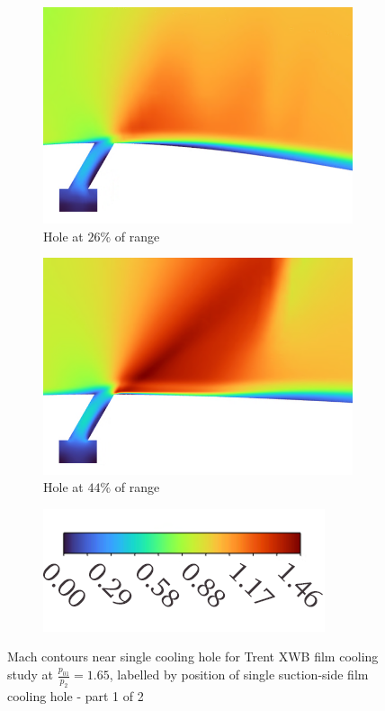 \documentclass[a4paper, 11pt, oneside]{report}
\begin{document}
\begin{figure}[H]
\begin{subfigure}{.42\textwidth}
		\includegraphics[width=\linewidth]{figs/sch_detail_mach_contours_2.png}
		\caption{Hole at $26\%$ of range}
	\end{subfigure}
	\hspace{0.05\textwidth}
	\begin{subfigure}{.42\textwidth}
		\centering
		\includegraphics[width=\linewidth]{figs/sch_detail_mach_contours_3.png}
		\caption{Hole at $44\%$ of range}
	\end{subfigure}
	\begin{subfigure}{.4\textwidth}
		\centering
		\includegraphics[width=\linewidth]{figs/mach_legend_sch_horizontal.png}
	\end{subfigure}
	\caption{Mach contours near single cooling hole for Trent XWB film cooling study at $\frac{p_{01}}{p_2}=1.65$, labelled by position of single suction-side film cooling hole - part 1 of 2}
	\label{fig:sch_detail_mach_0-3}
\end{figure}
\end{document}
